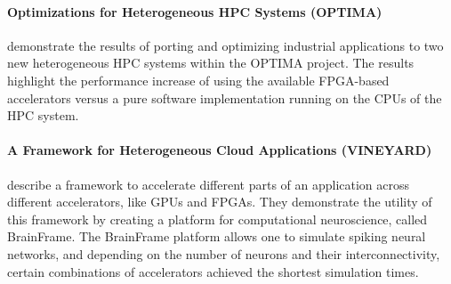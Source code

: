 \paragraph{Optimizations for Heterogeneous HPC Systems (OPTIMA)}
\citet{Theodoropoulos2023optima} demonstrate the results of porting and optimizing industrial applications to two new heterogeneous HPC systems within the OPTIMA project. The results highlight the performance increase of using the available FPGA-based accelerators versus a pure software implementation running on the CPUs of the HPC system.



\paragraph{A Framework for Heterogeneous Cloud Applications (VINEYARD)}
\citet{Sidiropoulos2018vineyard} describe a framework to accelerate different parts of an application across different accelerators, like GPUs and FPGAs. They demonstrate the utility of this framework by creating a platform for computational neuroscience, called BrainFrame. The BrainFrame platform allows one to simulate spiking neural networks, and depending on the number of neurons and their interconnectivity, certain combinations of accelerators achieved the shortest simulation times.

